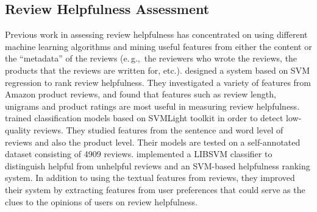 \documentclass[conference,compsoc]{IEEEtran}
\newcommand{\eg}{e.\,g.,\ }
\begin{document}
\subsection{Review Helpfulness Assessment}
Previous work in assessing review helpfulness has concentrated on using different machine learning algorithms and mining useful features from either the content or the ``metadata'' of the reviews (\eg the reviewers who wrote the reviews, the products that the reviews are written for, etc.). \cite{Kim_2006}  designed a system based on SVM regression to rank review helpfulness. They investigated a variety of features from Amazon product reviews, and found that features such as review length, unigrams and product ratings are most useful in measuring review helpfulness. \cite{Liu_2007} trained classification models based on SVMLight toolkit in order to detect low-quality reviews. They studied features from the sentence and word level of reviews and also the product level. Their models are tested on a self-annotated dataset consisting of 4909 reviews. \cite{Hong_2012} implemented a LIBSVM classifier to distinguish helpful from unhelpful reviews and an SVM-based helpfulness ranking system. In addition to using the textual features from reviews, they improved their system by extracting features from user preferences that could serve as the clues to the opinions of users on review helpfulness.
\end{document}
